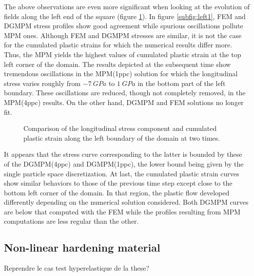 The above observations are even more significant when looking at the evolution of fields along the left end of the square (figure \ref{fig:left_line}).
In figure \ref{subfig:left1}, FEM and DGMPM stress profiles show good agreement while spurious oscillations pollute MPM ones. 
Although FEM and DGMPM stresses are similar, it is not the case for the cumulated plastic strains for which the numerical results differ more.
Thus, the MPM yields the highest values of cumulated plastic strain at the top left corner of the domain.
The results depicted at the subsequent time show tremendous oscillations in the MPM(1ppc) solution for which the longitudinal stress varies roughly from $-7 \: GPa$ to $1 \: GPa$ in the bottom part of the left boundary.
These oscillations are reduced, though not completely removed, in the MPM(4ppc) results. 
On the other hand, DGMPM and FEM solutions no longer fit.
\begin{figure}[ht]
  \centering
  {}
  {}
  
  \caption{Comparison of the longitudinal stress component and cumulated plastic strain along the left boundary of the domain at two times.}
  \label{fig:left_line}
\end{figure}
It appears that the stress curve corresponding to the latter is bounded by these of the DGMPM(4ppc) and DGMPM(1ppc), the lower bound being given by the single particle space discretization.
At last, the cumulated plastic strain curves show similar behaviors to those of the previous time step except close to the bottom left corner of the domain.
In that region, the plastic flow developed differently depending on the numerical solution considered.
Both DGMPM curves are below that computed with the FEM while the profiles resulting from MPM computations are less regular than the other.

\subsection{Non-linear hardening material}
\label{sec:non-linear-hardening}
Reprendre le cas test hyperelastique de la these?


